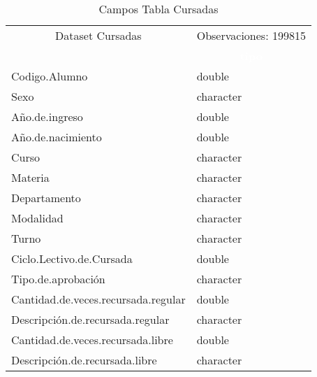 \begin{table}[!h]

\caption{\label{tab:tabla_Dataset_Cursadas}Campos Tabla Cursadas}
\centering
\fontsize{10}{12}\selectfont
\begin{tabular}[t]{ll}
\toprule
\multicolumn{1}{c}{Dataset Cursadas} & \multicolumn{1}{c}{Observaciones: 199815} \\
\cmidrule(l{3pt}r{3pt}){1-1} \cmidrule(l{3pt}r{3pt}){2-2}
\rowcolor{black}  \multicolumn{1}{c}{\textcolor{white}{\textbf{variable}}} & \multicolumn{1}{c}{\textcolor{white}{\textbf{tipo}}}\\
\midrule
\rowcolor{gray!6}  Codigo.Alumno & double\\
Sexo & character\\
\rowcolor{gray!6}  Año.de.ingreso & double\\
Año.de.nacimiento & double\\
\rowcolor{gray!6}  Curso & character\\
\addlinespace
Materia & character\\
\rowcolor{gray!6}  Departamento & character\\
Modalidad & character\\
\rowcolor{gray!6}  Turno & character\\
Ciclo.Lectivo.de.Cursada & double\\
\addlinespace
\rowcolor{gray!6}  Tipo.de.aprobación & character\\
Cantidad.de.veces.recursada.regular & double\\
\rowcolor{gray!6}  Descripción.de.recursada.regular & character\\
Cantidad.de.veces.recursada.libre & double\\
\rowcolor{gray!6}  Descripción.de.recursada.libre & character\\
\bottomrule
\end{tabular}
\end{table}
